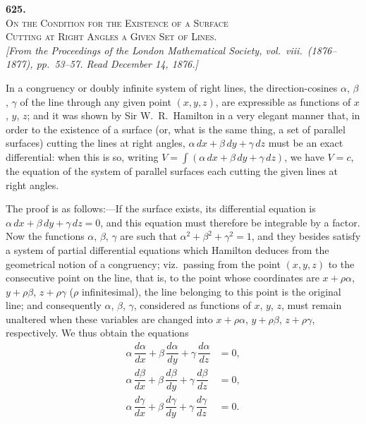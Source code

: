 \documentclass[11pt]{article}
\begin{document}
\bigskip\bigskip
\begin{center}
{\Large\bfseries 625.}\\[2pt]
{\large\scshape On the Condition for the Existence of a Surface}\\
{\large\scshape Cutting at Right Angles a Given Set of Lines.}\\[6pt]
\textit{[From the Proceedings of the London Mathematical Society, vol.~viii.\ (1876--1877), pp.~53--57. Read December 14, 1876.]}
\end{center}

\bigskip

In a congruency or doubly infinite system of right lines, the direction-cosines $\alpha$, $\beta$, $\gamma$ of the line through any given point $(x, y, z)$, are expressible as functions of $x$, $y$, $z$; and it was shown by Sir W.~R.~Hamilton in a very elegant manner that, in order to the existence of a surface (or, what is the same thing, a set of parallel surfaces) cutting the lines at right angles, $\alpha\,dx + \beta\,dy + \gamma\,dz$ must be an exact differential: when this is so, writing $V = \displaystyle\int(\alpha\,dx + \beta\,dy + \gamma\,dz)$, we have $V = c$, the equation of the system of parallel surfaces each cutting the given lines at right angles.

The proof is as follows:---If the surface exists, its differential equation is $\alpha\,dx + \beta\,dy + \gamma\,dz = 0$, and this equation must therefore be integrable by a factor. Now the functions $\alpha$, $\beta$, $\gamma$ are such that $\alpha^2 + \beta^2 + \gamma^2 = 1$, and they besides satisfy a system of partial differential equations which Hamilton deduces from the geometrical notion of a congruency; viz.\ passing from the point $(x, y, z)$ to the consecutive point on the line, that is, to the point whose coordinates are $x + \rho\alpha$, $y + \rho\beta$, $z + \rho\gamma$ ($\rho$ infinitesimal), the line belonging to this point is the original line; and consequently $\alpha$, $\beta$, $\gamma$, considered as functions of $x$, $y$, $z$, must remain unaltered when these variables are changed into $x + \rho\alpha$, $y + \rho\beta$, $z + \rho\gamma$, respectively. We thus obtain the equations
\begin{align*}
\alpha\,\dfrac{d\alpha}{dx} + \beta\,\dfrac{d\alpha}{dy} + \gamma\,\dfrac{d\alpha}{dz} &= 0,\\
\alpha\,\dfrac{d\beta}{dx} + \beta\,\dfrac{d\beta}{dy} + \gamma\,\dfrac{d\beta}{dz} &= 0,\\
\alpha\,\dfrac{d\gamma}{dx} + \beta\,\dfrac{d\gamma}{dy} + \gamma\,\dfrac{d\gamma}{dz} &= 0.
\end{align*}
\end{document}
